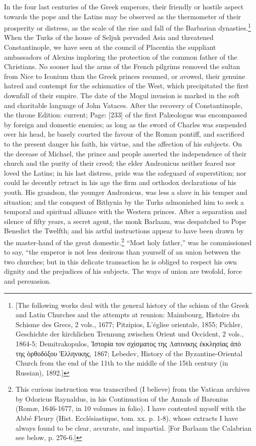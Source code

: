 In the four last centuries of the Greek emperors, their friendly or hostile aspect towards the pope and the Latins may be observed as the thermometer of their prosperity or distress, as the scale of the rise and fall of the Barbarian dynasties.\footnote{[The following works deal with the general history of the schism of the Greek and Latin Churches and the attempts at reunion: Maimbourg, Histoire du Schisme des Grecs, 2 vols., 1677; Pitzipios, L\texthebrew{}’église orientale, 1855; Pichler, Geschichte der kirchlichen Trennung zwischen Orient und Occident, 2 vols., 1864-5; Demitrakopulos, \textgreek{\texthebrew{Ἱ}στορία τον σχίσματος της Λατινικης \texthebrew{ἐ}κκλησίας \texthebrew{ἀ}π\texthebrew{ὸ} της \texthebrew{ὀ}ρθοδόξου \texthebrew{Ἑ}λληνικης}, 1867; Lebedev, History of the Byzantine-Oriental Church from the end of the 11th to the middle of the 15th century (in Russian), 1892.]} When the Turks of the house of Seljuk pervaded Asia and threatened Constantinople, we have seen at the council of Placentia the suppliant ambassadors of Alexius imploring the protection of the common father of the Christians. No sooner had the arms of the French pilgrims removed the sultan from Nice to Iconium than the Greek princes resumed, or avowed, their genuine hatred and contempt for the schismatics of the West, which precipitated the first downfall of their empire. The date of the Mogul invasion is marked in the soft and charitable language of John Vataces. After the recovery of Constantinople, the throne Edition: current; Page: [233] of the first Palæologus was encompassed by foreign and domestic enemies; as long as the sword of Charles was suspended over his head, he basely courted the favour of the Roman pontiff, and sacrificed to the present danger his faith, his virtue, and the affection of his subjects. On the decease of Michael, the prince and people asserted the independence of their church and the purity of their creed; the elder Andronicus neither feared nor loved the Latins; in his last distress, pride was the safeguard of superstition; nor could he decently retract in his age the firm and orthodox declarations of his youth. His grandson, the younger Andronicus, was less a slave in his temper and situation; and the conquest of Bithynia by the Turks admonished him to seek a temporal and spiritual alliance with the Western princes. After a separation and silence of fifty years, a secret agent, the monk Barlaam, was despatched to Pope Benedict the Twelfth; and his artful instructions appear to have been drawn by the master-hand of the great domestic.\footnote{This curious instruction was transcribed (I believe) from the Vatican archives by Odoricus Raynaldus, in his Continuation of the Annals of Baronius (Romæ, 1646-1677, in 10 volumes in folio). I have contented myself with the Abbé Fleury (Hist. Ecclésiastique, tom. xx. p. 1-8), whose extracts I have always found to be clear, accurate, and impartial. [For Barlaam the Calabrian see below, p. 276-6.]} \texthebrew{“}Most holy father,\texthebrew{}” was he commissioned to say, \texthebrew{“}the emperor is not less desirous than yourself of an union between the two churches; but in this delicate transaction he is obliged to respect his own dignity and the prejudices of his subjects. The ways of union are twofold, force and persuasion. 